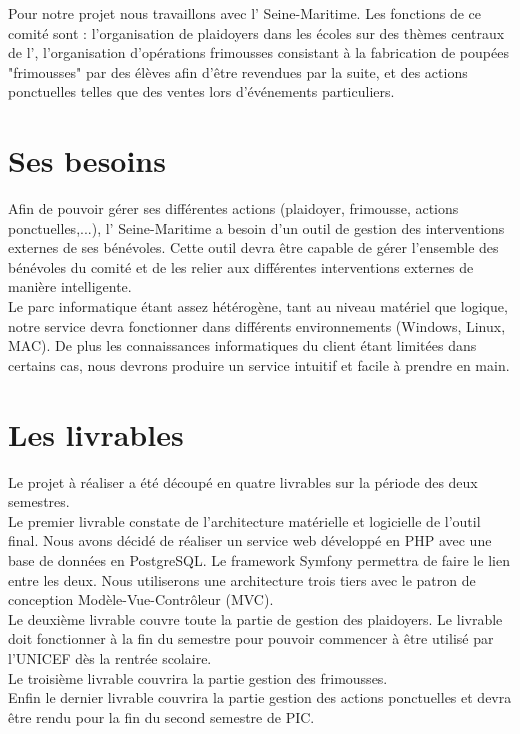 \documentclass[asi]{picInsa}
\begin{document}
Pour notre projet nous travaillons avec l'\nomClient{} Seine-Maritime. Les fonctions de ce comité sont : l'organisation de plaidoyers dans les écoles sur des thèmes centraux de l'\nomClient, l'organisation d'opérations frimousses consistant à la fabrication de poupées "frimousses" par des élèves afin d'être revendues par la suite, et des actions ponctuelles telles que des ventes lors d’événements particuliers.



\section{Ses besoins}
Afin de pouvoir gérer ses différentes actions (plaidoyer, frimousse, actions ponctuelles,...), l'\nomClient{} Seine-Maritime a besoin d'un outil de gestion des interventions externes de ses bénévoles. Cette outil devra être capable de gérer l'ensemble des bénévoles du comité et de les relier aux différentes interventions externes de manière intelligente.\\
Le parc informatique étant assez hétérogène, tant au niveau matériel que logique, notre service devra fonctionner dans différents environnements (Windows, Linux, MAC). De plus les connaissances informatiques du client étant limitées dans certains cas, nous devrons produire un service intuitif et facile à prendre en main.



\section{Les livrables}
Le projet à réaliser a été découpé en quatre livrables sur la période des deux semestres.\vspace{0.5cm}\\
Le premier livrable constate de l'architecture matérielle et logicielle de l'outil final. Nous avons décidé de réaliser un service web développé en PHP avec une base de données en PostgreSQL. Le framework Symfony permettra de faire le lien entre les deux. Nous utiliserons une architecture trois tiers avec le patron de conception Modèle-Vue-Contrôleur (MVC).\vspace{0.5cm}\\
Le deuxième livrable couvre toute la partie de gestion des plaidoyers. Le livrable doit fonctionner à la fin du semestre pour pouvoir commencer à être utilisé par l'UNICEF dès la rentrée scolaire.\vspace{0.5cm}\\
Le troisième livrable couvrira la partie gestion des frimousses.\vspace{0.5cm}\\
Enfin le dernier livrable couvrira la partie gestion des actions ponctuelles et devra être rendu pour la fin du second semestre de PIC.
\end{document}
